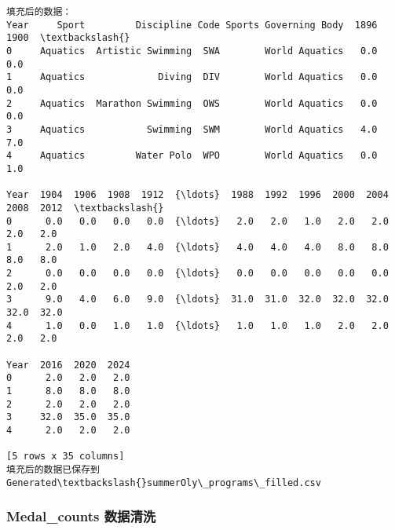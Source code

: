 \documentclass[11pt]{article}
\begin{document}
\begin{Verbatim}[commandchars=\\\{\}]
填充后的数据：
Year     Sport         Discipline Code Sports Governing Body  1896  1900  \textbackslash{}
0     Aquatics  Artistic Swimming  SWA        World Aquatics   0.0   0.0
1     Aquatics             Diving  DIV        World Aquatics   0.0   0.0
2     Aquatics  Marathon Swimming  OWS        World Aquatics   0.0   0.0
3     Aquatics           Swimming  SWM        World Aquatics   4.0   7.0
4     Aquatics         Water Polo  WPO        World Aquatics   0.0   1.0

Year  1904  1906  1908  1912  {\ldots}  1988  1992  1996  2000  2004  2008  2012  \textbackslash{}
0      0.0   0.0   0.0   0.0  {\ldots}   2.0   2.0   1.0   2.0   2.0   2.0   2.0
1      2.0   1.0   2.0   4.0  {\ldots}   4.0   4.0   4.0   8.0   8.0   8.0   8.0
2      0.0   0.0   0.0   0.0  {\ldots}   0.0   0.0   0.0   0.0   0.0   2.0   2.0
3      9.0   4.0   6.0   9.0  {\ldots}  31.0  31.0  32.0  32.0  32.0  32.0  32.0
4      1.0   0.0   1.0   1.0  {\ldots}   1.0   1.0   1.0   2.0   2.0   2.0   2.0

Year  2016  2020  2024
0      2.0   2.0   2.0
1      8.0   8.0   8.0
2      2.0   2.0   2.0
3     32.0  35.0  35.0
4      2.0   2.0   2.0

[5 rows x 35 columns]
填充后的数据已保存到 Generated\textbackslash{}summerOly\_programs\_filled.csv
    \end{Verbatim}

    \subsubsection{Medal\_counts
数据清洗}\label{medal_counts-ux6570ux636eux6e05ux6d17}
\end{document}
